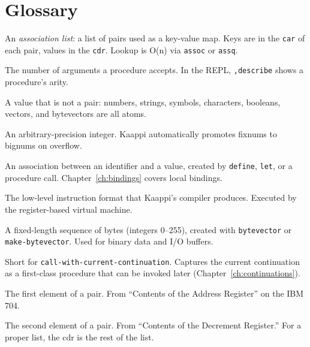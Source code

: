 \chapter{Glossary}
\label{app:glossary}

\begin{description}[leftmargin=2em, style=nextline]

\item[alist]
An \emph{association list}: a list of pairs used as a key-value map. Keys are in the \texttt{car} of each pair, values in the \texttt{cdr}. Lookup is O(n) via \texttt{assoc} or \texttt{assq}.

\item[arity]
The number of arguments a procedure accepts. In the REPL, \texttt{,describe} shows a procedure's arity.

\item[atom]
A value that is not a pair: numbers, strings, symbols, characters, booleans, vectors, and bytevectors are all atoms.

\item[bignum]
An arbitrary-precision integer. Kaappi automatically promotes fixnums to bignums on overflow.

\item[binding]
An association between an identifier and a value, created by \texttt{define}, \texttt{let}, or a procedure call. Chapter~\ref{ch:bindings} covers local bindings.

\item[bytecode]
The low-level instruction format that Kaappi's compiler produces. Executed by the register-based virtual machine.

\item[bytevector]
A fixed-length sequence of bytes (integers 0--255), created with \texttt{bytevector} or \texttt{make-bytevector}. Used for binary data and I/O buffers.

\item[call/cc]
Short for \texttt{call-with-current-continuation}. Captures the current continuation as a first-class procedure that can be invoked later (Chapter~\ref{ch:continuations}).

\item[car]
The first element of a pair. From ``Contents of the Address Register'' on the IBM 704.

\item[cdr]
The second element of a pair. From ``Contents of the Decrement Register.'' For a proper list, the cdr is the rest of the list.


\end{description}
